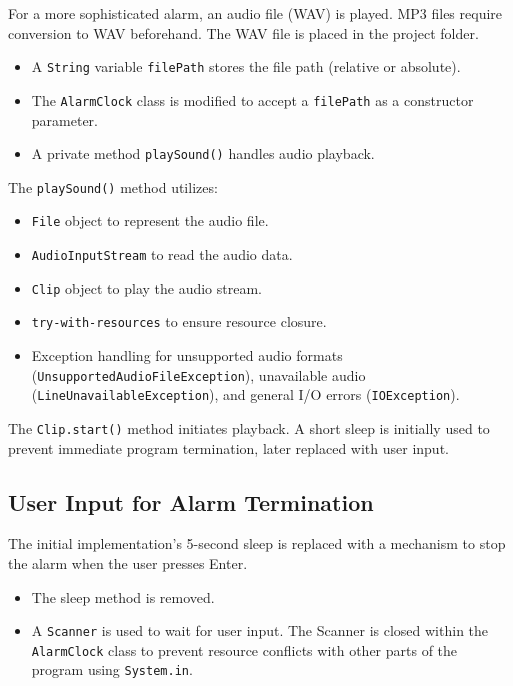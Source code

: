 \documentclass{article}
\begin{document}
\begin{itemize}
For a more sophisticated alarm, an audio file (WAV) is played.  MP3 files require conversion to WAV beforehand.  The WAV file is placed in the project folder.

\begin{itemize}
    \item A \texttt{String} variable \texttt{filePath} stores the file path (relative or absolute).
    \item The \texttt{AlarmClock} class is modified to accept a \texttt{filePath} as a constructor parameter.
    \item A private method \texttt{playSound()} handles audio playback.
\end{itemize}

The \texttt{playSound()} method utilizes:

\begin{itemize}
    \item \texttt{File} object to represent the audio file.
    \item \texttt{AudioInputStream} to read the audio data.
    \item \texttt{Clip} object to play the audio stream.
    \item \texttt{try-with-resources} to ensure resource closure.
    \item Exception handling for unsupported audio formats (\texttt{UnsupportedAudioFileException}), unavailable audio (\texttt{LineUnavailableException}), and general I/O errors (\texttt{IOException}).
\end{itemize}

The \texttt{Clip.start()} method initiates playback.  A short sleep is initially used to prevent immediate program termination, later replaced with user input.


\subsection{User Input for Alarm Termination}

The initial implementation's 5-second sleep is replaced with a mechanism to stop the alarm when the user presses Enter.

\begin{itemize}
    \item The sleep method is removed.
    \item A \texttt{Scanner} is used to wait for user input.  The Scanner is closed within the \texttt{AlarmClock} class to prevent resource conflicts with other parts of the program using \texttt{System.in}.
\end{itemize}


\end{itemize}
\end{document}
